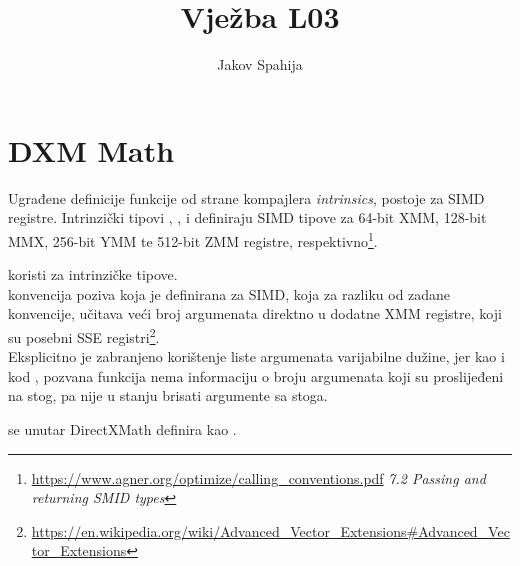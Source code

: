 
\usepackage{hyperref}
\usepackage[perpage,bottom]{footmisc}

\newcommand{\basedir}{~/FESB/2. semestar/3D Simulacije/Izvještaji/vjezba4}
\title{Vježba L03}
\author{Jakov Spahija}


\maketitle
\vspace{15em}
\tableofcontents
\pagebreak

\section{DXM Math}
\label{sec:math}
\setcounter{lstlisting}{0}

Ugrađene definicije funkcije od strane kompajlera \emph{intrinsics}, postoje za SIMD registre.  Intrinzički tipovi , ,  i  definiraju SIMD tipove za 64-bit XMM, 128-bit MMX, 256-bit YMM te 512-bit ZMM registre, respektivno\footnote{\url{https://www.agner.org/optimize/calling_conventions.pdf} \textit{7.2 Passing and returning SMID types}}.

 koristi  za intrinzičke tipove.\\

 konvencija poziva koja je definirana za SIMD, koja za razliku od zadane  konvencije, učitava veći broj argumenata direktno u dodatne XMM registre, koji su posebni SSE registri\footnote{\url{https://en.wikipedia.org/wiki/Advanced_Vector_Extensions\#Advanced_Vector_Extensions}}.\\

Eksplicitno je zabranjeno korištenje liste argumenata varijabilne dužine, jer kao i kod , pozvana funkcija nema informaciju o broju argumenata koji su proslijeđeni na stog, pa nije u stanju brisati argumente sa stoga.\\

\begin{codesection}
	
\end{codesection}
 se unutar DirectXMath definira kao .\\

